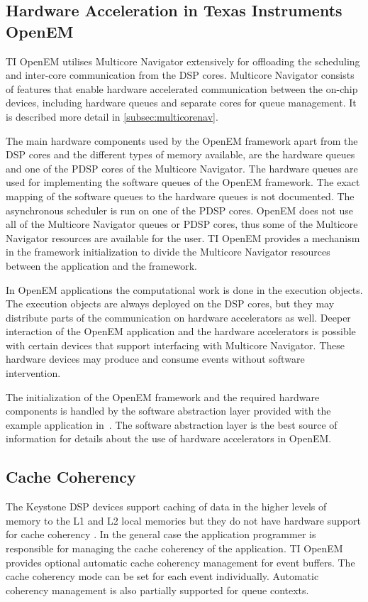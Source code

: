 \subsection{Hardware Acceleration in Texas Instruments OpenEM}
\label{subsec:ti-acceleration}
TI OpenEM utilises Multicore Navigator extensively for offloading the scheduling and inter-core communication from the DSP cores. Multicore Navigator consists of features that enable hardware accelerated communication between the on-chip devices, including hardware queues and separate cores for queue management. It is described more detail in \ref{subsec:multicorenav}.

The main hardware components used by the OpenEM framework apart from the DSP cores and the different types of memory available, are the hardware queues and one of the PDSP cores of the Multicore Navigator. The hardware queues are used for implementing the software queues of the OpenEM framework. The exact mapping of the software queues to the hardware queues is not documented. The asynchronous scheduler is run on one of the PDSP cores. OpenEM does not use all of the Multicore Navigator queues or PDSP cores, thus some of the Multicore Navigator resources are available for the user. TI OpenEM provides a mechanism in the framework initialization to divide the Multicore Navigator resources between the application and the framework.~\cite{openemuser}

In OpenEM applications the computational work is done in the execution objects. The execution objects are always deployed on the DSP cores, but they may distribute parts of the communication on hardware accelerators as well. Deeper interaction of the OpenEM application and the hardware accelerators is possible with certain devices that support interfacing with Multicore Navigator. These hardware devices may produce and consume events without software intervention.~\cite{openemwhite}

The initialization of the OpenEM framework and the required hardware components is handled by the software abstraction layer provided with the example application in~\cite{openemuser}. The software abstraction layer is the best source of information for details about the use of hardware accelerators in OpenEM.

\subsection{Cache Coherency}
\label{subsec:ti-cache-coherency}
The Keystone DSP devices support caching of data in the higher levels of memory to the L1 and L2 local memories but they do not have hardware support for cache coherency \cite{openemapi}. In the general case the application programmer is responsible for managing the cache coherency of the application. TI OpenEM provides optional automatic cache coherency management for event buffers. The cache coherency mode can be set for each event individually. Automatic coherency management is also partially supported for queue contexts.~\cite{openemwhite}

